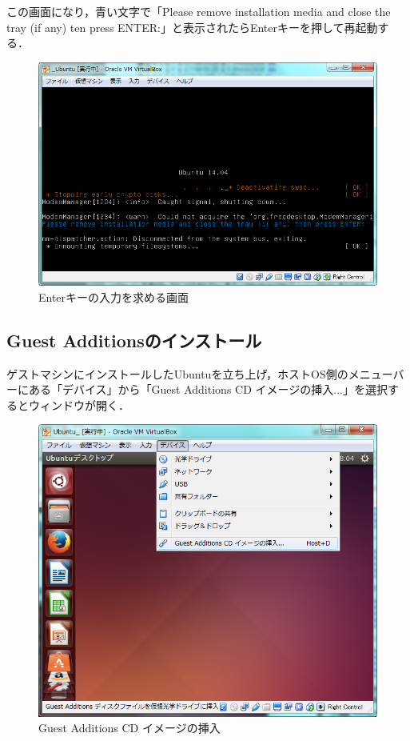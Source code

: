 この画面になり，青い文字で「Please remove installation media and close the tray (if any) ten press ENTER:」と表示されたらEnterキーを押して再起動する．

\begin{figure}[H]
\centering
\includegraphics[width=13cm]{press_enter.PNG}
\caption{Enterキーの入力を求める画面}\label{pressenter}
\end{figure}

\subsection{Guest Additionsのインストール}
ゲストマシンにインストールしたUbuntuを立ち上げ，ホストOS側のメニューバーにある「デバイス」から「Guest Additions CD イメージの挿入...」を選択するとウィンドウが開く．

\begin{figure}[H]
\centering
\includegraphics[width=13cm]{ubuntuguestadditionsinstall01.PNG}
\caption{Guest Additions CD イメージの挿入}\label{ubuntuguestadditionsinstall01}
\end{figure}
	

